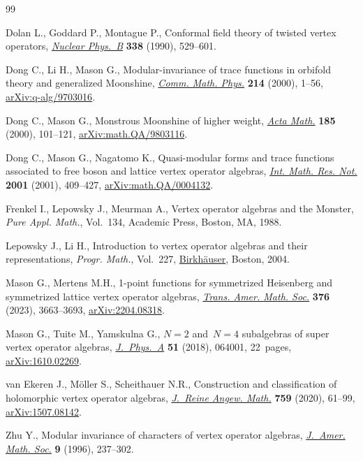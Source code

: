 \documentclass[pdftex]{sigma}
\numberwithin{equation}{section}
\theoremstyle{definition}
\begin{document}
\begin{thebibliography}{99}
\footnotesize\itemsep=0pt

Dolan L., Goddard P., Montague P., Conformal field theory of twisted vertex
 operators,
 \href{https://doi.org/10.1016/0550-3213(90)90644-S}{\textit{Nuclear Phys.~B}}
 \textbf{338} (1990), 529--601.

Dong C., Li H., Mason G., Modular-invariance of trace functions in orbifold
 theory and generalized {M}oonshine,
 \href{https://doi.org/10.1007/s002200000242}{\textit{Comm. Math. Phys.}}
 \textbf{214} (2000), 1--56,
 \href{http://arxiv.org/abs/q-alg/9703016}{arXiv:q-alg/9703016}.

Dong C., Mason G., Monstrous {M}oonshine of higher weight,
 \href{https://doi.org/10.1007/BF02392713}{\textit{Acta Math.}} \textbf{185}
 (2000), 101--121,
 \href{http://arxiv.org/abs/math/9803116}{arXiv:math.QA/9803116}.

Dong C., Mason G., Nagatomo K., Quasi-modular forms and trace functions
 associated to free boson and lattice vertex operator algebras,
 \href{https://doi.org/10.1155/S1073792801000204}{\textit{Int. Math. Res.
 Not.}} \textbf{2001} (2001), 409--427,
 \href{http://arxiv.org/abs/math.QA/0004132}{arXiv:math.QA/0004132}.

Frenkel I., Lepowsky J., Meurman A., Vertex operator algebras and the
 {M}onster, \textit{Pure Appl. Math.}, Vol.~134, Academic Press, Boston, MA,
 1988.

Lepowsky J., Li H., Introduction to vertex operator algebras and their
 representations, \textit{Progr. Math.}, Vol.~227,
 \href{https://doi.org/10.1007/978-0-8176-8186-9}{Birkh\"auser}, Boston, 2004.

Mason G., Mertens M.H., 1-point functions for symmetrized {H}eisenberg and
 symmetrized lattice vertex operator algebras,
 \href{https://doi.org/10.1090/tran/8861}{\textit{Trans. Amer. Math. Soc.}}
 \textbf{376} (2023), 3663--3693,
 \href{http://arxiv.org/abs/2204.08318}{arXiv:2204.08318}.

Mason G., Tuite M., Yamskulna G., {$N=2$} and~{$N=4$} subalgebras of super
 vertex operator algebras,
 \href{https://doi.org/10.1088/1751-8121/aa9f82}{\textit{J.~Phys.~A}}
 \textbf{51} (2018), 064001, 22~pages,
 \href{http://arxiv.org/abs/1610.02269}{arXiv:1610.02269}.

van Ekeren J., M\"oller S., Scheithauer N.R., Construction and classification
 of holomorphic vertex operator algebras,
 \href{https://doi.org/10.1515/crelle-2017-0046}{\textit{J.~Reine Angew.
 Math.}} \textbf{759} (2020), 61--99,
 \href{http://arxiv.org/abs/1507.08142}{arXiv:1507.08142}.

Zhu Y., Modular invariance of characters of vertex operator algebras,
 \href{https://doi.org/10.1090/S0894-0347-96-00182-8}{\textit{J.~Amer. Math.
 Soc.}} \textbf{9} (1996), 237--302.

\end{thebibliography}\LastPageEnding
\end{document}
